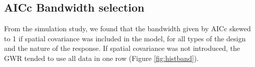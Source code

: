 \documentclass[a4paper]{article} 	%
\begin{document}

\subsection{AICc Bandwidth selection}\label{Sec:bandselect}

From the simulation study, we found that the bandwidth given by AICc skewed to 1 if spatial covariance was included in the model, for all types of the design and the nature of the response. If spatial covariance was not introduced, the GWR tended to use all data in one row (Figure \ref{fig:histband}). 
\end{document}
